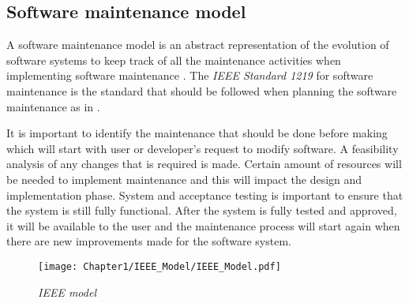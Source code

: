 \subsection{Software maintenance model}
A software maintenance model is an abstract representation of the evolution of software systems to keep track of all the maintenance activities when implementing software maintenance \cite{Ren2011}. The \textit{IEEE Standard 1219} for software maintenance is the standard that should be followed when planning the software maintenance as in .\par It is important to identify the maintenance that should be done before making which will start with user or developer's request to modify software. A feasibility analysis of any changes that is required is made. Certain amount of resources will be needed to implement maintenance and this will impact the design and implementation phase. System and acceptance testing is important to ensure that the system is still fully functional. After the system is fully tested and approved, it will be available to the user and the maintenance process will start again when there are new improvements made for the software system.

\begin{figure}[!htb] %
	\centering %
	\texttt{[image: Chapter1/IEEE\_Model/IEEE\_Model.pdf]}
	\caption[IEEE model]
	{\textit{IEEE model \cite{Ren2011}}} \label{fig:CH1_IEEE_Model}
\end{figure}

